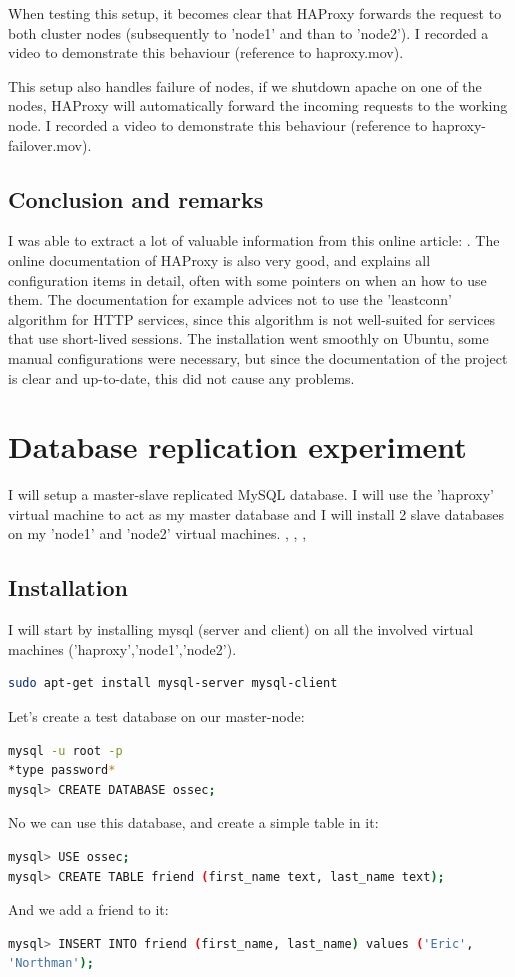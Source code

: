 \documentclass[12pt]{report}
\begin{document}
When testing this setup, it becomes clear that HAProxy forwards the
request to both cluster nodes (subsequently to 'node1' and than to
'node2').
I recorded a video to demonstrate this behaviour (reference to
haproxy.mov).

This setup also handles failure of nodes, if we shutdown apache on one
of the nodes, HAProxy will automatically forward the incoming requests
to the working node. 
I recorded a video to demonstrate this behaviour (reference to
haproxy-failover.mov).

\subsection{Conclusion and remarks}
I was able to extract a lot of valuable information from this online
article: \cite{haproxy_install_tutorial}. The online documentation of
 HAProxy \cite{haproxy:2013} is also very good, and explains all
 configuration items in detail, often with some pointers on when an
 how to use them. The documentation for example advices not to use the
 'leastconn' algorithm for HTTP services, since this algorithm is not
 well-suited for services that use short-lived sessions.
The installation went smoothly on Ubuntu, some manual configurations
were necessary, but since the documentation of the project is clear
and up-to-date, this did not cause any problems.

\section{Database replication experiment}
I will setup a master-slave replicated MySQL database. I will use the
'haproxy' virtual machine to act as my master database and I will
install 2 slave databases on my 'node1' and 'node2' virtual machines.
\cite{mysql_official_replication_doc},
\cite{mysql_replication_howtoforge}, 
\cite{mysql_replication_stackexchange}, 

\subsection{Installation} 
I will start by installing mysql (server and client) on all the involved virtual
machines ('haproxy','node1','node2').
\begin{lstlisting}[language=bash]
sudo apt-get install mysql-server mysql-client
\end{lstlisting}

Let's create a test database on our master-node:
\begin{lstlisting}[language=bash]
mysql -u root -p
*type password*
mysql> CREATE DATABASE ossec;
\end{lstlisting}
No we can use this database, and create a simple table in it:
\begin{lstlisting}[language=bash]
mysql> USE ossec;
mysql> CREATE TABLE friend (first_name text, last_name text);
\end{lstlisting}
And we add a friend to it:
\begin{lstlisting}[language=bash]
mysql> INSERT INTO friend (first_name, last_name) values ('Eric',
'Northman');
\end{lstlisting}
\end{document}
